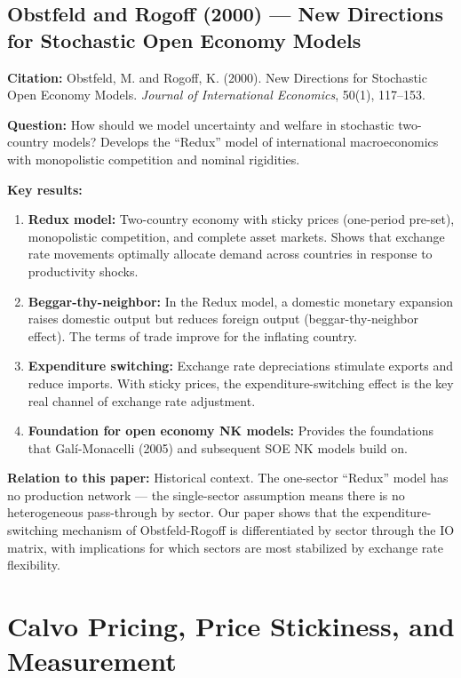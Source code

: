 \documentclass[12pt]{article}
\begin{document}
\subsection{Obstfeld and Rogoff (2000) --- New Directions for Stochastic Open Economy Models}

\textbf{Citation:} Obstfeld, M. and Rogoff, K. (2000). New Directions for Stochastic Open Economy Models. \textit{Journal of International Economics}, 50(1), 117--153.

\textbf{Question:} How should we model uncertainty and welfare in stochastic two-country models? Develops the ``Redux'' model of international macroeconomics with monopolistic competition and nominal rigidities.

\textbf{Key results:}
\begin{enumerate}
    \item \textbf{Redux model:} Two-country economy with sticky prices (one-period pre-set), monopolistic competition, and complete asset markets. Shows that exchange rate movements optimally allocate demand across countries in response to productivity shocks.
    \item \textbf{Beggar-thy-neighbor:} In the Redux model, a domestic monetary expansion raises domestic output but reduces foreign output (beggar-thy-neighbor effect). The terms of trade improve for the inflating country.
    \item \textbf{Expenditure switching:} Exchange rate depreciations stimulate exports and reduce imports. With sticky prices, the expenditure-switching effect is the key real channel of exchange rate adjustment.
    \item \textbf{Foundation for open economy NK models:} Provides the foundations that Galí-Monacelli (2005) and subsequent SOE NK models build on.
\end{enumerate}

\textbf{Relation to this paper:} Historical context. The one-sector ``Redux'' model has no production network --- the single-sector assumption means there is no heterogeneous pass-through by sector. Our paper shows that the expenditure-switching mechanism of Obstfeld-Rogoff is differentiated by sector through the IO matrix, with implications for which sectors are most stabilized by exchange rate flexibility.

\section{Calvo Pricing, Price Stickiness, and Measurement}
\end{document}
